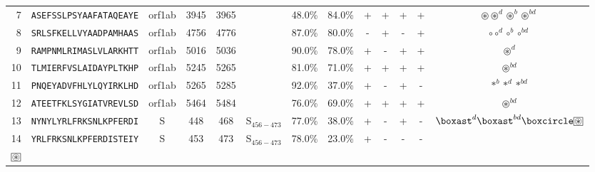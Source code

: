 \begin{tabular}{rcccccccccccc}
7  &  \texttt{ASEFSSLPSYAAFATAQEAYE} &  orf1ab &   3945 &  3965 &                &                          48.0\% &                           84.0\% &          + &           + &          + &           + &                                                     $ \circledast \circledast^d \circledast^b \circledast^{bd} $ \\
8  &  \texttt{SRLSFKELLVYAADPAMHAAS} &  orf1ab &   4756 &  4776 &                &                          87.0\% &                           80.0\% &          - &           + &          - &           + &                                                                             $ \circ \circ^d \circ^b \circ^{bd} $ \\
9  &  \texttt{RAMPNMLRIMASLVLARKHTT} &  orf1ab &   5016 &  5036 &                &                          90.0\% &                           78.0\% &          + &           - &          + &           + &                                                                                                $ \circledast^d $ \\
10 &  \texttt{TLMIERFVSLAIDAYPLTKHP} &  orf1ab &   5245 &  5265 &                &                          81.0\% &                           71.0\% &          + &           + &          + &           + &                                                                                             $ \circledast^{bd} $ \\
11 &  \texttt{PNQEYADVFHLYLQYIRKLHD} &  orf1ab &   5265 &  5285 &                &                          92.0\% &                           37.0\% &          + &           - &          + &           - &                                                                                      $ \ast^b \ast^d \ast^{bd} $ \\
12 &  \texttt{ATEETFKLSYGIATVREVLSD} &  orf1ab &   5464 &  5484 &                &                          76.0\% &                           69.0\% &          + &           + &          + &           + &                                                                                             $ \circledast^{bd} $ \\
13 &  \texttt{NYNYLYRLFRKSNLKPFERDI} &       S &    448 &   468 &  S$_{456-473}$ &                          77.0\% &                           38.0\% &          + &           - &          + &           - &                            $ \boxast^d \boxast^{bd} \boxcircle \setlength{\fboxsep}{0.5pt} \boxed{\circledast} $ \\
14 &  \texttt{YRLFRKSNLKPFERDISTEIY} &       S &    453 &   473 &  S$_{456-473}$ &                          78.0\% &                           23.0\% &          + &           - &          - &           - &  \Centerstack{  $\boxempty \boxast \boxast^b \boxcircle$ \\  $\setlength{\fboxsep}{0.5pt} \boxed{\circledast}$ } \\

\end{tabular}
